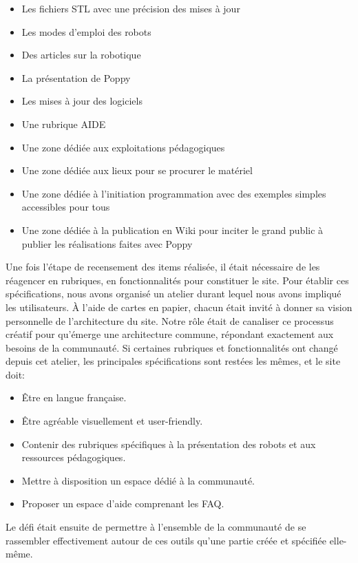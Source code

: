         \begin{itemize}\myItemStyle
          \item Les fichiers STL avec une précision des mises à jour
          \item Les modes d’emploi des robots
          \item Des articles sur la robotique
          \item La présentation de Poppy
          \item Les mises à jour des logiciels
          \item Une rubrique AIDE
          \item Une zone dédiée aux exploitations pédagogiques
          \item Une zone dédiée aux lieux pour se procurer le matériel
          \item Une zone dédiée à l'initiation programmation avec des exemples simples accessibles pour tous
          \item Une zone dédiée à la publication en Wiki pour inciter le grand public à publier les réalisations faites avec Poppy
        \end{itemize}\par%
        Une fois l'étape de recensement des items réalisée, il était nécessaire de les réagencer en rubriques, en fonctionnalités pour constituer le site.
        Pour établir ces spécifications, nous avons organisé un atelier durant lequel nous avons impliqué les utilisateurs. À l'aide de cartes en papier, chacun était invité à donner sa vision personnelle de l'architecture du site. Notre rôle était de canaliser ce processus créatif pour qu'émerge une architecture commune, répondant exactement aux besoins de la communauté. Si certaines rubriques et fonctionnalités ont changé depuis cet atelier, les principales spécifications sont restées les mêmes, et le site doit:
        \begin{itemize}\myItemStyle
          \item Être en langue française.
          \item Être agréable visuellement et user-friendly.
          \item Contenir des rubriques spécifiques à la présentation des robots et aux ressources pédagogiques.
          \item Mettre à disposition un espace dédié à la communauté.
          \item Proposer un espace d'aide comprenant les FAQ.
        \end{itemize}\par%
        Le défi était ensuite de permettre à l'ensemble de la communauté de se rassembler effectivement autour de ces outils qu'une partie créée et spécifiée elle-même.